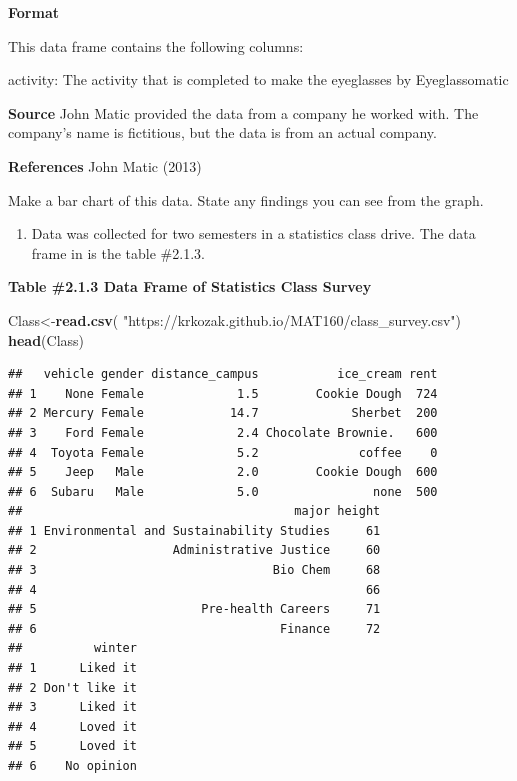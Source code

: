 \documentclass[
]{book}
\newenvironment{Shaded}{\begin{snugshade}}{\end{snugshade}}
\newcommand{\KeywordTok}[1]{\textcolor[rgb]{0.13,0.29,0.53}{\textbf{#1}}}
\newcommand{\NormalTok}[1]{#1}
\newcommand{\StringTok}[1]{\textcolor[rgb]{0.31,0.60,0.02}{#1}}
\providecommand{\tightlist}{%
  \setlength{\itemsep}{0pt}\setlength{\parskip}{0pt}}
\begin{document}
\textbf{Format}

This data frame contains the following columns:

activity: The activity that is completed to make the eyeglasses by Eyeglassomatic

\textbf{Source}
John Matic provided the data from a company he worked with. The company's name is fictitious, but the data is from an actual company.

\textbf{References}
John Matic (2013)

Make a bar chart of this data. State any findings you can see from the graph.

\begin{enumerate}
\def\labelenumi{\arabic{enumi}.}
\setcounter{enumi}{1}
\tightlist
\item
  Data was collected for two semesters in a statistics class drive. The data frame in is the table \#2.1.3.
\end{enumerate}

\textbf{Table \#2.1.3 Data Frame of Statistics Class Survey}

\begin{Shaded}
\begin{Highlighting}[]
\NormalTok{Class<-}\KeywordTok{read.csv}\NormalTok{(}
  \StringTok{"https://krkozak.github.io/MAT160/class_survey.csv"}\NormalTok{)}
\KeywordTok{head}\NormalTok{(Class)}
\end{Highlighting}
\end{Shaded}

\begin{verbatim}
##   vehicle gender distance_campus           ice_cream rent
## 1    None Female             1.5        Cookie Dough  724
## 2 Mercury Female            14.7             Sherbet  200
## 3    Ford Female             2.4 Chocolate Brownie.   600
## 4  Toyota Female             5.2              coffee    0
## 5    Jeep   Male             2.0        Cookie Dough  600
## 6  Subaru   Male             5.0                none  500
##                                      major height
## 1 Environmental and Sustainability Studies     61
## 2                   Administrative Justice     60
## 3                                 Bio Chem     68
## 4                                              66
## 5                       Pre-health Careers     71
## 6                                  Finance     72
##          winter
## 1      Liked it
## 2 Don't like it
## 3      Liked it
## 4      Loved it
## 5      Loved it
## 6    No opinion
\end{verbatim}
\end{document}

